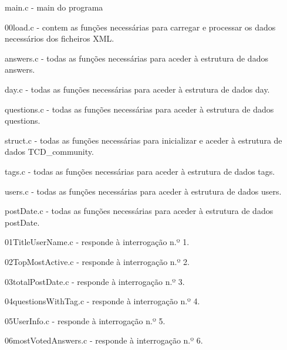 \documentclass[a4paper]{article}
\begin{document}
\begin{itemize}
\begin{item} main.c - main do programa\end{item}
\begin{item} 00load.c - contem as funções necessárias para carregar e processar os
dados necessários dos ficheiros XML.\end{item}
\begin{item} answers.c - todas as funções necessárias para aceder à estrutura de
dados answers.\end{item}
\begin{item} day.c - todas as funções necessárias para aceder à estrutura de
dados day.\end{item}
\begin{item} questions.c - todas as funções necessárias para aceder à estrutura de
dados questions.\end{item}
\begin{item} struct.c - todas as funções necessárias para inicializar e aceder à
estrutura de dados TCD\_community.\end{item}
\begin{item} tags.c - todas as funções necessárias para aceder à estrutura de
dados tags.\end{item}
\begin{item} users.c - todas as funções necessárias para aceder à estrutura de
dados users.\end{item}
\begin{item} postDate.c - todas as funções necessárias para aceder à estrutura de
dados postDate.\end{item}
\begin{item} 01TitleUserName.c - responde à interrogação n.º 1.\end{item}
\begin{item} 02TopMostActive.c - responde à interrogação n.º 2.\end{item}
\begin{item} 03totalPostDate.c - responde à interrogação n.º 3.\end{item}
\begin{item} 04questionsWithTag.c - responde à interrogação n.º 4.\end{item}
\begin{item} 05UserInfo.c - responde à interrogação n.º 5.\end{item}
\begin{item} 06mostVotedAnswers.c - responde à interrogação n.º 6.\end{item}

\end{itemize}
\end{document}
